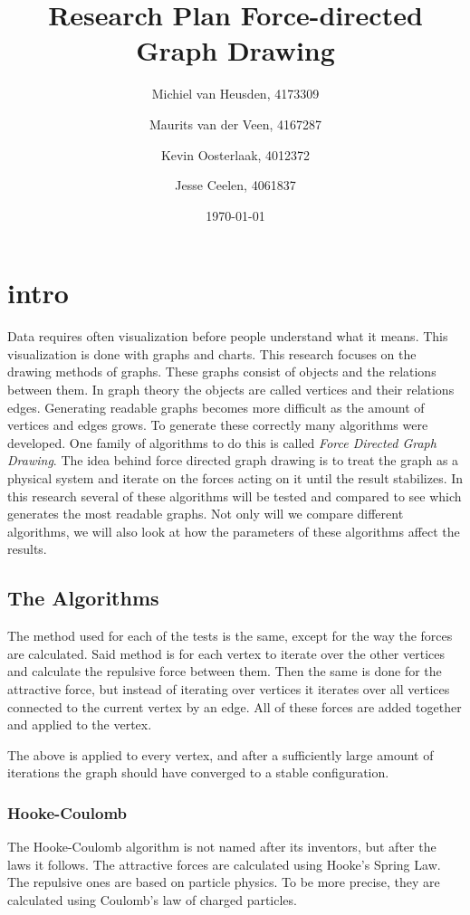 \documentclass[a4paper,12pt]{article}
\title{Research Plan Force-directed Graph Drawing}
\author{
  Michiel van Heusden, 4173309 \and
  Maurits van der Veen, 4167287 \and
  Kevin Oosterlaak, 4012372 \and
  Jesse Ceelen, 4061837
  }
\date{\today}
\begin{document}
  \maketitle
  \tableofcontents
  \section{intro}
  Data requires often visualization before people understand what it means.
  This visualization is done with graphs and charts.
  This research focuses on the drawing methods of graphs.
  These graphs consist of objects and the relations between them.
  In graph theory the objects are called vertices and their relations edges.\cite{bondy1976graph}
  Generating readable graphs becomes more difficult as the amount of vertices and edges grows.
  To generate these correctly many algorithms were developed.
  One family of algorithms to do this is called \emph{Force Directed Graph Drawing}.
  The idea behind force directed graph drawing is to treat the graph as a physical system and iterate on the forces acting on it until the result stabilizes. In this research several of these algorithms will be tested and compared to see which generates the most readable graphs.
  Not only will we compare different algorithms, we will also look at how the parameters of these algorithms affect the results.

  \subsection{The Algorithms}\label{par:algorithms}
    The method used for each of the tests is the same,  except for the way the forces are calculated.
    Said method is for each vertex to iterate over the other vertices and calculate the repulsive force between them.
    Then the same is done for the attractive force, but instead of iterating over vertices it iterates over all vertices connected to the current vertex by an edge. All of these forces are added together and applied to the vertex.
    
    The above is applied to every vertex, and after a sufficiently large amount of iterations the graph should have converged to a stable configuration.

    \subsubsection{Hooke-Coulomb}
    The Hooke-Coulomb algorithm is not named after its inventors, but after the laws it follows.
    The attractive forces are calculated using Hooke's Spring Law.
    The repulsive ones are based on particle physics.
    To be more precise, they are calculated using Coulomb's law of charged particles.
\end{document}
